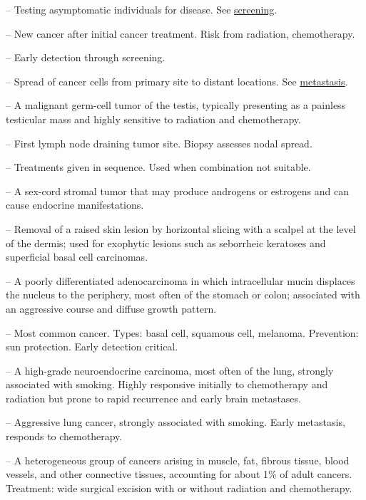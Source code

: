 -- Testing asymptomatic individuals for disease. See \hyperlink{Screening}{screening}.

-- New cancer after initial cancer treatment. Risk from radiation, chemotherapy.

-- Early detection through screening.

-- Spread of cancer cells from primary site to distant locations. See \hyperlink{Metastasis}{metastasis}.

-- A malignant germ-cell tumor of the testis, typically presenting as a painless testicular mass and highly sensitive to radiation and chemotherapy.

-- First lymph node draining tumor site. Biopsy assesses nodal spread.

-- Treatments given in sequence. Used when combination not suitable.

-- A sex-cord stromal tumor that may produce androgens or estrogens and can cause endocrine manifestations.

-- Removal of a raised skin lesion by horizontal slicing with a scalpel at the level of the dermis; used for exophytic lesions such as seborrheic keratoses and superficial basal cell carcinomas.

-- A poorly differentiated adenocarcinoma in which intracellular mucin displaces the nucleus to the periphery, most often of the stomach or colon; associated with an aggressive course and diffuse growth pattern.

-- Most common cancer. Types: basal cell, squamous cell, melanoma. Prevention: sun protection. Early detection critical.

-- A high-grade neuroendocrine carcinoma, most often of the lung, strongly associated with smoking. Highly responsive initially to chemotherapy and radiation but prone to rapid recurrence and early brain metastases.

-- Aggressive lung cancer, strongly associated with smoking. Early metastasis, responds to chemotherapy.

-- A heterogeneous group of cancers arising in muscle, fat, fibrous tissue, blood vessels, and other connective tissues, accounting for about 1\% of adult cancers. Treatment: wide surgical excision with or without radiation and chemotherapy.

